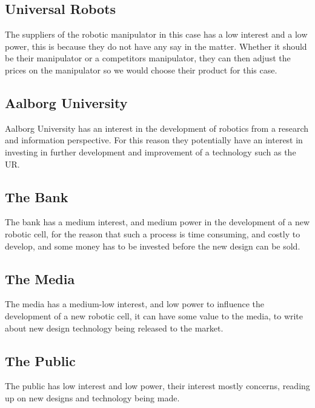\subsection{Universal Robots}\label{ch:Universalrobots-stake}
The suppliers of the robotic manipulator in this case has a low interest and a low power, this is because they do not have any say in the matter. Whether it should be their manipulator or a competitors manipulator, they can then adjust the prices on the manipulator so we would choose their product for this case. 

\subsection{Aalborg University}\label{ch:Aau-stake}
Aalborg University has an interest in the development of robotics from a research and information perspective. For this reason they potentially have an interest in investing in further development and improvement of a technology such as the UR. 

\subsection{The Bank}\label{ch:Bank-stake}
The bank has a medium interest, and medium power in the development of a new robotic cell, for the reason that such a process is time consuming, and costly to develop, and some money has to be invested before the new design can be sold.

\subsection{The Media}\label{ch:Media-stake}
The media has a medium-low interest, and low power to influence the development of a new robotic cell, it can have some value to the media, to write about new design technology being released to the market.

\subsection{The Public}\label{ch:Public-stake}
The public has low interest and low power, their interest mostly concerns, reading up on new designs and technology being made.